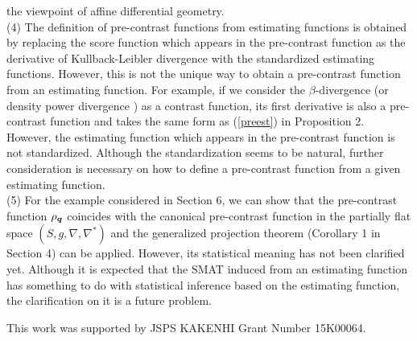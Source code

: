 \documentclass[graybox]{svmult}
\newcommand{\bms}[1]{\mbox{\scriptsize\boldmath $#1$}}
\begin{document}
    the viewpoint of affine differential geometry. \vspace{2mm} \\
%
(4) The definition of pre-contrast functions from estimating functions is obtained by replacing
    the score function which appears in the pre-contrast function as the derivative of
    Kullback-Leibler divergence with the standardized estimating functions.
    However, this is not the unique way to obtain a pre-contrast function from an estimating
    function. For example, if we consider the $\beta$-divergence \cite{EK} (or density power
    divergence \cite{BHHJ}) as a contrast function, its first derivative is also a pre-contrast
    function and takes the same form as (\ref{preest}) in Proposition 2.
    However, the estimating function which appears in the pre-contrast function is not
    standardized. Although the standardization seems to be natural, further consideration is
    necessary on how to define a pre-contrast function from a given estimating function. \vspace{2mm} \\
%
(5) For the example considered in Section 6,  we can show that the pre-contrast function
     $\rho_{\bms{q}}$ coincides with the canonical pre-contrast function in the partially flat
     space $(S,g,\nabla,\nabla^{\ast})$ and the generalized projection theorem (Corollary 1 
     in Section 4) can be applied. However, its statistical meaning has not been clarified yet. 
     Although it is expected that the SMAT induced from an estimating function has something
     to do with statistical inference based on the estimating function, the clarification on it is 
     a future problem.

\begin{acknowledgement}
This work was supported by JSPS KAKENHI Grant Number 15K00064.
\end{acknowledgement}
\end{document}
